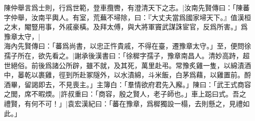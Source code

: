 \documentclass{article}
\begin{document}
\Song

\guji


陳仲舉言爲士則，行爲世範，登車攬轡，有澄清天下之志。|{汝南先賢傳曰：「陳蕃字仲舉，汝南平輿人。有室，荒蕪不埽除，曰：『大丈夫當爲國家埽天下。』值漢桓之末，閹豎用事，外戚豪橫。及拜太傅，與大將軍竇武謀誅宦官，反爲所害。」}爲豫章太守，|{海內先賢傳曰：「蕃爲尚書，以忠正忤貴戚，不得在臺，遷豫章太守。」}至，便問徐孺子所在，欲先看之。|{謝承後漢書曰：「徐穉字孺子，豫章南昌人。清妙高跱，超世絕俗。前後爲諸公所辟，雖不就，及其死，萬里赴弔。常豫炙雞一隻，以綿漬酒中，㬥乾以裹雞，徑到所赴冢隧外，以水漬綿，斗米飯，白茅爲藉，以雞置前。酹酒畢，留謁即去，不見喪主。」}主簿白：「羣情欲府君先入廨。」陳曰：「武王式商容之閭，席不暇煗。|{許叔重曰：「商容，殷之賢人，老子師也。」車上跽曰式。}吾之禮賢，有何不可！」|{袁宏漢紀曰：「蕃在豫章，爲穉獨設⼀榻，去則懸之，見禮如此。」}
\endguji
\end{document}
